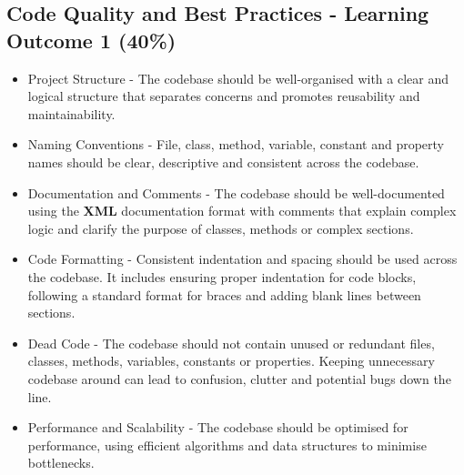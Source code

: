\documentclass{article}
\begin{document}
\subsection*{Code Quality and Best Practices - Learning Outcome 1 (40\%)}
\begin{itemize}
    \item Project Structure - The codebase should be well-organised with a clear and logical structure that separates concerns and promotes reusability and maintainability.
	\item Naming Conventions - File, class, method, variable, constant and property names should be clear, descriptive and consistent across the codebase. 
    \item Documentation and Comments - The codebase should be well-documented using the \textbf{XML} documentation format with comments that explain complex logic and clarify the purpose of classes, methods or complex sections. 
    \item Code Formatting - Consistent indentation and spacing should be used across the codebase. It includes ensuring proper indentation for code blocks, following a standard format for braces and adding blank lines between sections. 
    \item Dead Code - The codebase should not contain unused or redundant files, classes, methods, variables, constants or properties. Keeping unnecessary codebase around can lead to confusion, clutter and potential bugs down the line.
    \item Performance and Scalability - The codebase should be optimised for performance, using efficient algorithms and data structures to minimise bottlenecks. 
\end{itemize}
\end{document}
